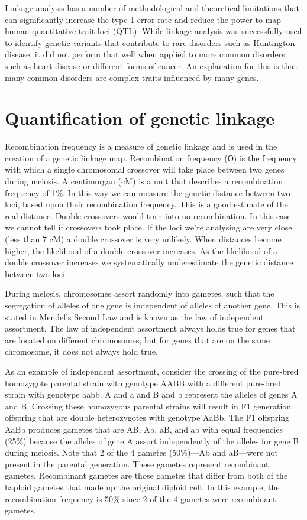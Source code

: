 Linkage analysis has a number of methodological and theoretical limitations that can significantly increase the type-1 error rate and reduce the power to map human quantitative trait loci (QTL). While linkage analysis was successfully used to identify genetic variants that contribute to rare disorders such as Huntington disease, it did not perform that well when applied to more common disorders such as heart disease or different forms of cancer. An explanation for this is that many common disorders are complex traits influenced by many genes.

\hypertarget{quantification-of-genetic-linkage}{%
\section{Quantification of genetic linkage}\label{quantification-of-genetic-linkage}}

Recombination frequency is a measure of genetic linkage and is used in the creation of a genetic linkage map. Recombination frequency (ϴ) is the frequency with which a single chromosomal crossover will take place between two genes during meiosis. A centimorgan (cM) is a unit that describes a recombination frequency of 1\%. In this way we can measure the genetic distance between two loci, based upon their recombination frequency. This is a good estimate of the real distance. Double crossovers would turn into no recombination. In this case we cannot tell if crossovers took place. If the loci we're analysing are very close (less than 7 cM) a double crossover is very unlikely. When distances become higher, the likelihood of a double crossover increases. As the likelihood of a double crossover increases we systematically underestimate the genetic distance between two loci.

During meiosis, chromosomes assort randomly into gametes, such that the segregation of alleles of one gene is independent of alleles of another gene. This is stated in Mendel's Second Law and is known as the law of independent assortment. The law of independent assortment always holds true for genes that are located on different chromosomes, but for genes that are on the same chromosome, it does not always hold true.

As an example of independent assortment, consider the crossing of the pure-bred homozygote parental strain with genotype AABB with a different pure-bred strain with genotype aabb. A and a and B and b represent the alleles of genes A and B. Crossing these homozygous parental strains will result in F1 generation offspring that are double heterozygotes with genotype AaBb. The F1 offspring AaBb produces gametes that are AB, Ab, aB, and ab with equal frequencies (25\%) because the alleles of gene A assort independently of the alleles for gene B during meiosis. Note that 2 of the 4 gametes (50\%)---Ab and aB---were not present in the parental generation. These gametes represent recombinant gametes. Recombinant gametes are those gametes that differ from both of the haploid gametes that made up the original diploid cell. In this example, the recombination frequency is 50\% since 2 of the 4 gametes were recombinant gametes.

